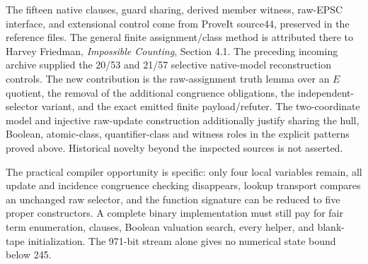 The fifteen native clauses, guard sharing, derived member witness,
raw-EPSC interface, and extensional control come from ProveIt source44,
preserved in the reference files. The general finite assignment/class
method is attributed there to Harvey Friedman, \emph{Impossible
Counting}, Section 4.1. The preceding incoming archive supplied the
20/53 and 21/57 selective native-model reconstruction controls.
The new contribution is the raw-assignment truth lemma over an
$E$ quotient, the removal of the additional congruence obligations,
the independent-selector variant, and the exact emitted finite
payload/refuter. The two-coordinate model and injective raw-update
construction additionally justify sharing the hull, Boolean, atomic-class,
quantifier-class and witness roles in the explicit patterns proved above.
Historical novelty beyond the inspected sources is
not asserted.

The practical compiler opportunity is specific: only four local
variables remain, all update and incidence congruence checking
disappears, lookup transport compares an unchanged raw selector, and
the function signature can be reduced to five proper constructors.
A complete binary implementation must still pay for fair term
enumeration, clauses, Boolean valuation search, every helper,
and blank-tape initialization. The 971-bit stream alone gives
no numerical state bound below 245.
